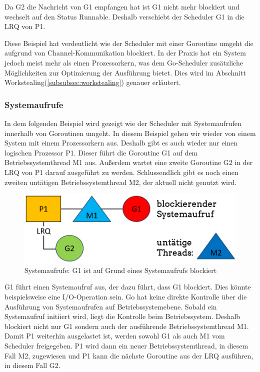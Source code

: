 \documentclass[fontsize=12pt,paper=a4,twoside=semi,parskip=half-,headsepline,headinclude]{scrreprt}
\begin{document}
Da G2 die Nachricht von G1 empfangen hat ist G1 nicht mehr blockiert und wechselt auf den Status Runnable. Deshalb verschiebt der Scheduler G1 in die LRQ von P1.

Diese Beispiel hat verdeutlicht wie der Scheduler mit einer Goroutine umgeht die aufgrund von Channel-Kommunikation blockiert. In der Praxis hat ein System jedoch meist mehr als einen Prozessorkern, was dem Go-Scheduler zusätzliche Möglichkeiten zur Optimierung der Ausführung bietet. Dies wird im Abschnitt Workstealing(\ref{subsubsec:workstealing}) genauer erläutert.

\subsubsection{Systemaufrufe}

In dem folgenden Beispiel wird gezeigt wie der Scheduler mit Systemaufrufen innerhalb von Goroutinen umgeht. In diesem Beispiel gehen wir wieder von einem System mit einem Prozessorkern aus. Deshalb gibt es auch wieder nur einen logischen Prozessor P1. Dieser führt die Goroutine G1 auf dem Betriebssystemthread M1 aus. Außerdem wartet eine zweite Goroutine G2 in der LRQ von P1 darauf ausgeführt zu werden. Schlussendlich gibt es noch einen zweiten untätigen Betriebssystemthread M2, der aktuell nicht genutzt wird.

\begin{figure}[h]
	\centering
	\includegraphics[scale=0.5]{figures/GoroutineSystemaufrufe1.png}
	\caption{Systemaufrufe: G1 ist auf Grund eines Systemaufrufs blockiert}
	\label{fig:GoroutineSystemaufrufe1}
\end{figure}

G1 führt einen Systemaufruf aus, der dazu führt, dass G1 blockiert. Dies könnte beispielsweise eine I/O-Operation sein. Go hat keine direkte Kontrolle über die Ausführung von Systemaufrufen auf Betriebssystemebene. Sobald ein Systemaufruf initiiert wird, liegt die Kontrolle beim Betriebssystem. Deshalb blockiert nicht nur G1 sondern auch der ausführende Betriebssystemthread M1. Damit P1 weiterhin ausgelastet ist, werden sowohl G1 als auch M1 vom Scheduler freigegeben. P1 wird dann ein neuer Betriebssystemthread, in diesem Fall M2, zugewiesen und P1 kann die nächste Goroutine aus der LRQ ausführen, in diesem Fall G2.
\end{document}
